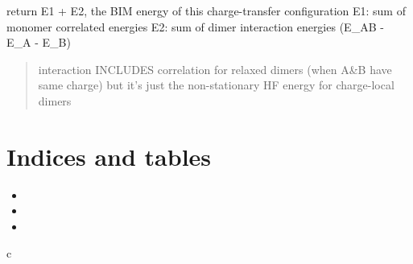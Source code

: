 \documentclass[letterpaper,10pt,english]{sphinxmanual}
\begin{document}
\begin{fulllineitems}
\begin{fulllineitems}
\end{fulllineitems}


\begin{fulllineitems}
\label{\detokenize{background:ChargeState.ChargeState.diag_chargelocal_dimers}}
return E1 + E2, the BIM energy of this charge-transfer configuration
E1: sum of monomer correlated energies
E2: sum of dimer interaction energies (E\_AB - E\_A - E\_B)
\begin{quote}

interaction INCLUDES correlation for relaxed dimers (when A\&B have same charge)
but it's just the non-stationary HF energy for charge-local dimers
\end{quote}

\end{fulllineitems}


\end{fulllineitems}



\chapter{Indices and tables}
\label{\detokenize{index:indices-and-tables}}\begin{itemize}
\item {} 

\item {} 

\item {} 

\end{itemize}


\renewcommand{\indexname}{Python Module Index}
\begin{sphinxtheindex}
\def\bigletter#1{{\Large\sffamily#1}\nopagebreak\vspace{1mm}}
\bigletter{c}
\item {}
\end{sphinxtheindex}

\renewcommand{\indexname}{Index}
\printindex
\end{document}
